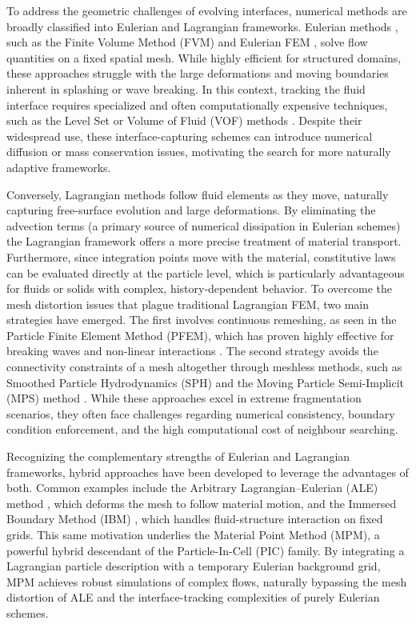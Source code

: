 \documentclass[11pt,english]{article}
\begin{document}
     To address the geometric challenges of evolving interfaces, numerical methods are broadly classified into Eulerian and Lagrangian frameworks. Eulerian methods \cite{colella1985direct}, such as the Finite Volume Method (FVM) and Eulerian FEM \cite{wesseling2001principles,versteeg2007introduction}, solve flow quantities on a fixed spatial mesh. While highly efficient for structured domains, these approaches struggle with the large deformations and moving boundaries inherent in splashing or wave breaking. In this context, tracking the fluid interface requires specialized and often computationally expensive techniques, such as the Level Set \cite{osher2004level, Rossi2012eb} or Volume of Fluid (VOF) methods \cite{hirt1981volume}. Despite their widespread use, these interface-capturing schemes can introduce numerical diffusion or mass conservation issues, motivating the search for more naturally adaptive frameworks.

    Conversely, Lagrangian methods follow fluid elements as they move, naturally capturing free-surface evolution and large deformations. By eliminating the advection terms (a primary source of numerical dissipation in Eulerian schemes) the Lagrangian framework offers a more precise treatment of material transport. Furthermore, since integration points move with the material, constitutive laws can be evaluated directly at the particle level, which is particularly advantageous for fluids or solids with complex, history-dependent behavior.
    To overcome the mesh distortion issues that plague traditional Lagrangian FEM, two main strategies have emerged. The first involves continuous remeshing, as seen in the Particle Finite Element Method (PFEM), which has proven highly effective for breaking waves and non-linear interactions \cite{cremonesi2020state}. The second strategy avoids the connectivity constraints of a mesh altogether through meshless methods, such as Smoothed Particle Hydrodynamics (SPH) \cite{gingold1977smoothed} and the Moving Particle Semi-Implicit (MPS) method \cite{koshizuka1996moving}. While these approaches excel in extreme fragmentation scenarios, they often face challenges regarding numerical consistency, boundary condition enforcement, and the high computational cost of neighbour searching.

    Recognizing the complementary strengths of Eulerian and Lagrangian frameworks, hybrid approaches have been developed to leverage the advantages of both. Common examples include the Arbitrary Lagrangian–Eulerian (ALE) method \cite{hirt1974arbitrary}, which deforms the mesh to follow material motion, and the Immersed Boundary Method (IBM) \cite{peskin2002immersed}, which handles fluid-structure interaction on fixed grids. This same motivation underlies the Material Point Method (MPM), a powerful hybrid descendant of the Particle-In-Cell (PIC) family. By integrating a Lagrangian particle description with a temporary Eulerian background grid, MPM achieves robust simulations of complex flows, naturally bypassing the mesh distortion of ALE and the interface-tracking complexities of purely Eulerian schemes.
\end{document}
